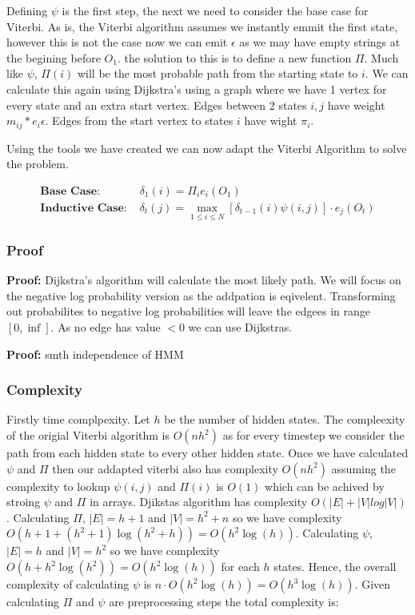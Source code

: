 Defining $\psi$ is the first step, the next we need to consider the base case for Viterbi. As is, the Viterbi algorithm assumes we instantly emmit the first state, however this is not the case now we can emit $\epsilon$ as we may have empty strings at the begining before $O_1$. the solution to this is to define a new function $\Pi$. Much like $\psi$, $\Pi(i)$ will be the most probable path from the starting state to $i$. We can calculate this again using Dijkstra's using a graph where we have 1 vertex for every state and an extra start vertex. Edges between 2 states $i,j$ have weight $m_{ij}*e_i{\epsilon}$. Edges from the start vertex to states $i$ have wight $\pi_i$.

Using the tools we have created we can now adapt the Viterbi Algorithm to solve the problem.


\begin{align*}
    \textbf{Base Case: } &\delta_1(i) = \Pi_i e_i(O_1)\\
    \textbf{Inductive Case: } &\delta_t(j) = \max_{1\leq i \leq N}[\delta_{t-1}(i)\psi(i,j)]\cdot e_j(O_t)
\end{align*}

\subsubsection*{Proof}
\textbf{Proof:} Dijkstra's algorithm will calculate the most likely path. We will focus on the negative log probability version as the addpation is eqivelent. Transforming out probabilites to negative log probabilities will leave the edgees in range $[0, \inf]$. As no edge has value $<0$ we can use Dijkstras.

\textbf{Proof:} smth independence of HMM



\subsubsection*{Complexity}
Firstly time complpexity. Let $h$ be the number of hidden states. The compleexity of the origial Viterbi algorithm is $O(nh^2)$ as for every timestep we consider the path from each hidden state to every other hidden state. Once we have calculated $\psi$ and $\Pi$ then our addapted viterbi also has complexity $O(nh^2)$ assuming the complexity to lookup $\psi(i,j)$ and $\Pi(i)$ is $O(1)$ which can be achived by stroing $\psi$ and $\Pi$ in arrays. Djikstas algorithm has complexity $O(|E|+|V|log|V|)$. Calculating $\Pi$, $|E| = h+1$ and $|V| = h^2 + n$ so we have complexity $O(h+1 + (h^2+1) \log(h^2+h)) = O(h^2 \log(h))$. Calculating $\psi$, $|E| = h$ and $|V| = h^2$ so we have complexity $O(h + h^2 \log(h^2)) = O(h^2 \log(h))$ for each $h$ states. Hence, the overall complexity of calculating $\psi$ is $n\cdot O(h^2 \log(h)) = O(h^3 \log(h))$. Given calculating $\Pi$ and $\psi$ are preprocessing steps the total complexity is: 

